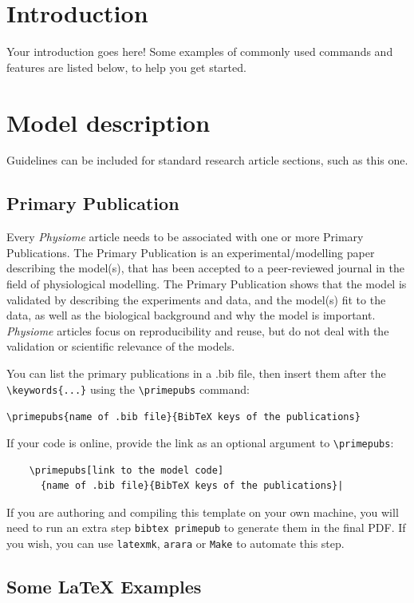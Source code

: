\section{Introduction}

Your introduction goes here! Some examples of commonly used commands and features are listed below, to help you get started.

\section{Model description}

Guidelines can be included for standard research article sections, such as this one.

\subsection{Primary Publication}

Every \emph{Physiome} article needs to be associated with one or more Primary Publications. The Primary Publication is an experimental/modelling paper describing the model(s), that has been accepted to a peer-reviewed journal in the field of physiological modelling. The Primary Publication shows that the model is validated by describing the experiments and data, and the model(s) fit to the data, as well as the biological background and why the model is important.
\emph{Physiome} articles focus on reproducibility and reuse, but do not deal with the validation or scientific relevance of the models.

You can list the primary publications in a .bib file, then insert them after the \verb|\keywords{...}| using the \verb|\primepubs| command:

\verb|\primepubs{name of .bib file}{BibTeX keys of the publications}|

If your code is online, provide the link as an optional argument to \verb|\primepubs|:

\begin{verbatim}
    \primepubs[link to the model code]
      {name of .bib file}{BibTeX keys of the publications}|
\end{verbatim}

If you are authoring and compiling this template on your own machine, you will need to run an extra step \verb|bibtex primepub| to generate them in the final PDF. If you wish, you can use \texttt{latexmk}, \texttt{arara} or \texttt{Make} to automate this step.

\subsection{Some \LaTeX{} Examples}
\label{sec:examples}

